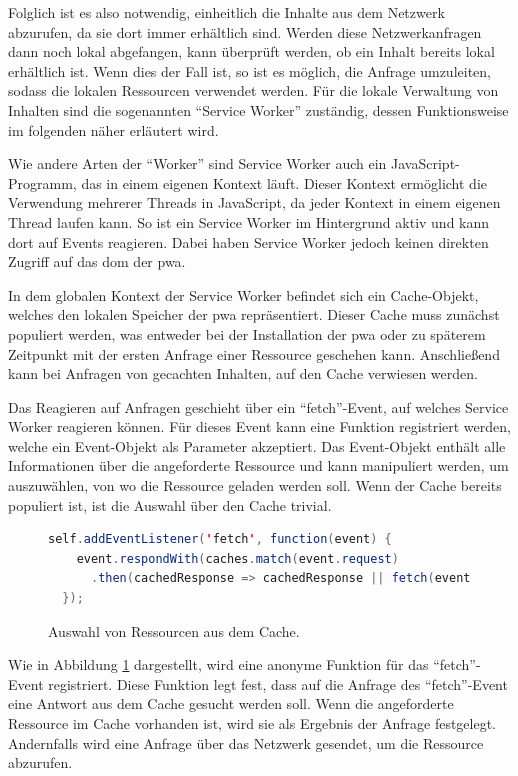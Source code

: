 \documentclass[12pt, parskip=half]{scrartcl}       %
\begin{document}
Folglich ist es also notwendig, einheitlich die Inhalte aus dem Netzwerk abzurufen, da sie dort immer erhältlich sind.
Werden diese Netzwerkanfragen dann noch lokal abgefangen, kann überprüft werden, ob ein Inhalt bereits lokal erhältlich ist.
Wenn dies der Fall ist, so ist es möglich, die Anfrage umzuleiten, sodass die lokalen Ressourcen verwendet werden.
Für die lokale Verwaltung von Inhalten sind die sogenannten \enquote{Service Worker} zuständig, dessen Funktionsweise im folgenden näher erläutert wird.

Wie andere Arten der \enquote{Worker} sind Service Worker auch ein JavaScript-Programm, das in einem eigenen Kontext läuft.
Dieser Kontext ermöglicht die Verwendung mehrerer Threads in JavaScript, da jeder Kontext in einem eigenen Thread laufen kann.
So ist ein Service Worker im Hintergrund aktiv und kann dort auf Events reagieren.
Dabei haben Service Worker jedoch keinen direkten Zugriff auf das \ac{dom} der \ac{pwa}.

In dem globalen Kontext der Service Worker befindet sich ein Cache-Objekt, welches den lokalen Speicher der \ac{pwa} repräsentiert\cite{w3c_serviceworker_nightly}.
Dieser Cache muss zunächst populiert werden, was entweder bei der Installation der \ac{pwa} oder zu späterem Zeitpunkt mit der ersten Anfrage einer Ressource geschehen kann\cite{ServiceWorker_explained}.
Anschließend kann bei Anfragen von gecachten Inhalten, auf den Cache verwiesen werden.

Das Reagieren auf Anfragen geschieht über ein \enquote{fetch}-Event, auf welches Service Worker reagieren können.
Für dieses Event kann eine Funktion registriert werden, welche ein Event-Objekt als Parameter akzeptiert.
Das Event-Objekt enthält alle Informationen über die angeforderte Ressource und kann manipuliert werden, um auszuwählen, von wo die Ressource geladen werden soll.
Wenn der Cache bereits populiert ist, ist die Auswahl über den Cache trivial.

\begin{figure}[h]
\begin{lstlisting}[language=java]
  self.addEventListener('fetch', function(event) {
    event.respondWith(caches.match(event.request)
      .then(cachedResponse => cachedResponse || fetch(event.request)))
  });
\end{lstlisting}
\caption{Auswahl von Ressourcen aus dem Cache.\cite{heise_pwa2}}
\label{fig:js_cache}
\end{figure}

Wie in Abbildung \ref{fig:js_cache} dargestellt, wird eine anonyme Funktion für das \enquote{fetch}-Event registriert.
Diese Funktion legt fest, dass auf die Anfrage des \enquote{fetch}-Event eine Antwort aus dem Cache gesucht werden soll.
Wenn die angeforderte Ressource im Cache vorhanden ist, wird sie als Ergebnis der Anfrage festgelegt.
Andernfalls wird eine Anfrage über das Netzwerk gesendet, um die Ressource abzurufen.
\end{document}
